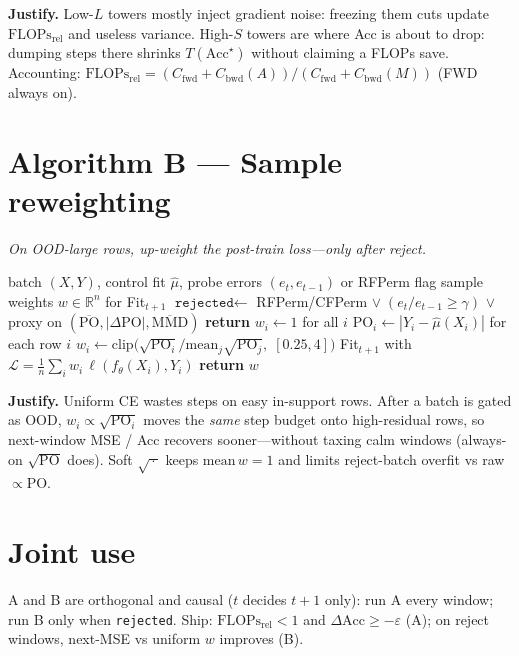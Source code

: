 \documentclass[11pt]{article}
\newcommand{\PO}{\mathrm{PO}}
\newcommand{\Acc}{\mathrm{Acc}}
\newcommand{\Flops}{\mathrm{FLOPs}_{\mathrm{rel}}}
\begin{document}
\noindent\textbf{Justify.}
Low-$L$ towers mostly inject gradient noise: freezing them cuts update
$\Flops$ and useless variance.
High-$S$ towers are where Acc is about to drop: dumping steps there
shrinks $T(\Acc^\star)$ without claiming a FLOPs save.
Accounting: $\Flops=(C_{\mathrm{fwd}}+C_{\mathrm{bwd}}(A))/(C_{\mathrm{fwd}}+C_{\mathrm{bwd}}(M))$
(FWD always on).

\section{Algorithm B --- Sample reweighting}
\emph{On OOD-large rows, up-weight the post-train loss---only after reject.}

\begin{algorithm}[H]
\caption{PO-sample post-train step (window $t\to t{+}1$)}
\label{alg:samp}
\begin{algorithmic}[1]
\Require batch $(X,Y)$, control fit $\hat\mu$, probe errors $(e_t,e_{t-1})$ or RFPerm flag
\Ensure sample weights $w\in\mathbb{R}^n$ for Fit$_{t+1}$
\State $\texttt{rejected} \gets$
      RFPerm/CFPerm
      $\lor\; (e_t/e_{t-1}\ge\gamma)$
      $\lor\;$ proxy on $(\overline{\PO},|\Delta\PO|,\overline{\mathrm{MMD}})$
  \State \textbf{return} $w_i\gets 1$ for all $i$
\EndIf
\State $\PO_i \gets |Y_i-\hat\mu(X_i)|$ for each row $i$
\State $w_i \gets
      \mathrm{clip}\!\big(
        \sqrt{\PO_i}/\mathrm{mean}_j\sqrt{\PO_j},\;[0.25,4]
      \big)$
\State Fit$_{t+1}$ with
      $\mathcal{L}=\frac1n\sum_i w_i\,\ell(f_\theta(X_i),Y_i)$
\State \textbf{return} $w$
\end{algorithmic}
\end{algorithm}

\noindent\textbf{Justify.}
Uniform CE wastes steps on easy in-support rows.
After a batch is gated as OOD, $w_i\propto\sqrt{\PO_i}$ moves the
\emph{same} step budget onto high-residual rows, so next-window MSE /
Acc recovers sooner---without taxing calm windows (always-on $\sqrt{\PO}$
does). Soft $\sqrt{\,\cdot\,}$ keeps $\mathrm{mean}\,w=1$ and limits
reject-batch overfit vs raw $\propto\PO$.

\section{Joint use}
A and B are orthogonal and causal ($t$ decides $t{+}1$ only):
run A every window; run B only when \texttt{rejected}.
Ship: $\Flops<1$ and $\Delta\Acc\ge-\varepsilon$ (A);
on reject windows, next-MSE vs uniform $w$ improves (B).
\end{document}
